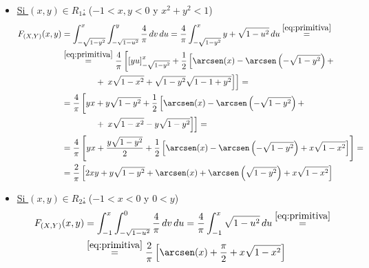 \documentclass[12pt]{article}
\begin{document}
\begin{ejercicio}[5 puntos]
\begin{enumerate}
\begin{itemize}
        \item \ul{Si $(x,y)\in R_1$:} ($-1<x,y<0$ y $x^2+y^2<1$)        
        \begin{align*}
            F_{(X,Y)}(x, y) & 
            = \int_{-\sqrt{1-y^2}}^x \int_{-\sqrt{1-u^2}}^y \dfrac{4}{\pi} \, dv \, du
            = \dfrac{4}{\pi} \int_{-\sqrt{1-y^2}}^x y+\sqrt{1-u^2} \, du
            \stackrel{\eqref{eq:primitiva}}{=}\\&\stackrel{\eqref{eq:primitiva}}{=} \dfrac{4}{\pi} \left[\left[yu\right]_{-\sqrt{1-y^2}}^x + \dfrac{1}{2}\left[\arcsen(x)-\arcsen\left(-\sqrt{1-y^2}\right)+\right.\right.
            \\&\qquad\qquad +\left.\left.x\sqrt{1-x^2}+\sqrt{1-y^2}\sqrt{1-1+y^2}\right]\right]
            =\\&= \dfrac{4}{\pi} \left[yx +y\sqrt{1-y^2} + \dfrac{1}{2}\left[\arcsen(x)-\arcsen\left(-\sqrt{1-y^2}\right)+\right.\right.
            \\&\qquad\qquad +\left.\left.x\sqrt{1-x^2}-y\sqrt{1-y^2}\right]\right]
            =\\&= \dfrac{4}{\pi} \left[yx + \dfrac{y\sqrt{1-y^2}}{2} + \dfrac{1}{2}\left[\arcsen(x)-\arcsen\left(-\sqrt{1-y^2}\right)+x\sqrt{1-x^2}\right]\right]
            =\\&= \dfrac{2}{\pi} \left[2xy + y\sqrt{1-y^2} + \arcsen(x)+\arcsen\left(\sqrt{1-y^2}\right)+x\sqrt{1-x^2}\right]
        \end{align*}

        \item \ul{Si $(x,y)\in R_2$:} ($-1<x<0$ y $0<y$)
        \begin{align*}
            F_{(X,Y)}(x, y) &= \int_{-1}^x \int_{-\sqrt{1-u^2}}^0 \dfrac{4}{\pi} \, dv \, du
            = \dfrac{4}{\pi} \int_{-1}^x \sqrt{1-u^2} \, du
            \stackrel{\eqref{eq:primitiva}}{=}\\&\stackrel{\eqref{eq:primitiva}}{=} \dfrac{2}{\pi}\left[\arcsen(x)+\frac{\pi}{2}+x\sqrt{1-x^2}\right]
        \end{align*}


\end{itemize}
\end{enumerate}
\end{ejercicio}
\end{document}
